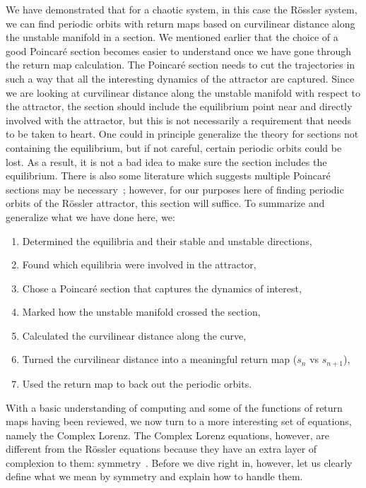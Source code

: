 \documentclass[10pt,letter]{article}
\begin{document}
We have demonstrated that for a chaotic system, in this case the
R\"ossler system, we can find periodic orbits with return maps based on
curvilinear distance along the unstable manifold in a section. We
mentioned earlier that the choice of a good Poincar\'e section becomes
easier to understand once we have gone through the return map
calculation.  The Poincar\'e section needs to cut the trajectories in
such a way that all the interesting dynamics of the attractor are
captured.  Since we are looking at curvilinear distance along the
unstable manifold with respect to the attractor, the section should
include the equilibrium point near and directly involved with the
attractor, but this is not necessarily a requirement that needs to be
taken to heart.  One could in principle generalize the theory for
sections not containing the equilibrium, but if not careful, certain
periodic orbits could be lost.  As a result, it is not a bad idea to make
sure the section includes the equilibrium.  There is also some literature
which suggests multiple Poincar\'e sections may be necessary~\cite{Atl};
however, for our purposes here of finding periodic orbits of the
R\"ossler attractor, this section will suffice.
To summarize and generalize what we have done here, we:
\begin{enumerate}
    \item Determined the equilibria and their stable and unstable directions,
    \item Found which equilibria were involved in the attractor,
    \item Chose a Poincar\'e section that captures the dynamics of interest,
    \item Marked how the unstable manifold crossed the section,
    \item Calculated the curvilinear distance along the curve,
    \item Turned the curvilinear distance into a meaningful return map
          ($s_{n}$ vs $s_{n+1}$),
    \item Used the return map to back out the periodic orbits.
\end{enumerate}

With a basic understanding of computing and some of the functions of
return maps having been reviewed, we now turn to a more interesting set
of equations, namely the Complex Lorenz.  The Complex Lorenz equations,
however, are different from the R\"ossler equations because they have an
extra layer of complexion to them: symmetry~\cite{Eth}.  Before we dive
right in, however, let us clearly define what we mean by symmetry and
explain how to handle them.
\end{document}
